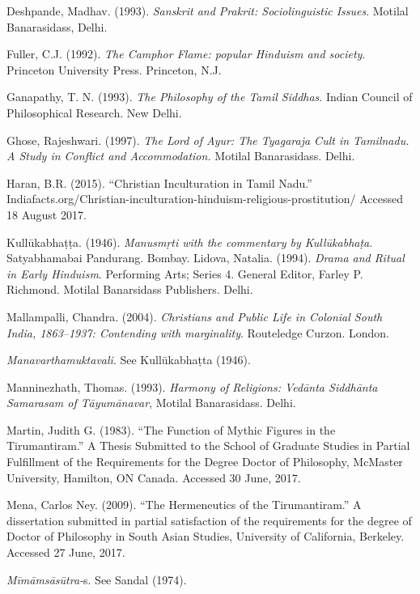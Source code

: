 \begin{thebibliography}{99}
  Deshpande, Madhav. (1993). \textit{Sanskrit and Prakrit: Sociolinguistic Issues}. Motilal Banarasidass, Delhi.

  Fuller, C.J. (1992). \textit{The Camphor Flame: popular Hinduism and society}. Princeton University Press. Princeton, N.J.

  Ganapathy, T. N. (1993). \textit{The Philosophy of the Tamil Siddhas}. Indian Council of Philosophical Research. New Delhi.

  Ghose, Rajeshwari. (1997). \textit{The Lord of Ayur: The Tyagaraja Cult in Tamilnadu. A Study in Conflict and Accommodation.} Motilal Banarasidass. Delhi.

  Haran, B.R. (2015). “Christian Inculturation in Tamil Nadu.” Indiafacts.org/Christian-inculturation-hinduism-religious-prostitution/ Accessed 18 August 2017.

  Kullūkabhaṭṭa. (1946). \textit{Manusmṛti with the commentary by Kullūkabhaṭa}. Satyabhamabai Pandurang. Bombay. Lidova, Natalia. (1994). \textit{Drama and Ritual in Early Hinduism}. Performing Arts; Series 4. General Editor, Farley P. Richmond. Motilal Banarsidass Publishers. Delhi.

  Mallampalli, Chandra. (2004). \textit{Christians and Public Life in Colonial South India, 1863–1937: Contending with marginality}. Routeledge Curzon. London.

  \textit{Manavarthamuktavali}. See Kullūkabhaṭta (1946).

  Manninezhath, Thomas. (1993). \textit{Harmony of Religions: Vedānta Siddhānta Samarasam of Tāyumānavar}, Motilal Banarasidass. Delhi.

  Martin, Judith G. (1983). “The Function of Mythic Figures in the Tirumantiram.” A Thesis Submitted to the School of Graduate Studies in Partial Fulfillment of the Requirements for the Degree Doctor of Philosophy, McMaster University, Hamilton, ON Canada. Accessed 30 June, 2017.

  Mena, Carlos Ney. (2009). “The Hermeneutics of the Tirumantiram.” A dissertation submitted in partial satisfaction of the requirements for the degree of Doctor of Philosophy in South Asian Studies, University of California, Berkeley. Accessed 27 June, 2017.

  \textit{Mīmāmsāsūtra-}s. See Sandal (1974).


\end{thebibliography}

